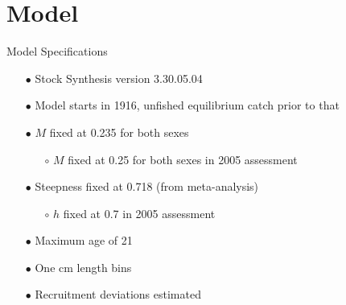\documentclass[ignorenonframetext,]{beamer}
\def\begincol{\begin{column}}
\def\endcol{\end{column}}
\def\endcols{\end{columns}}
\begin{document}

\section{Model}\label{model}

\begin{frame}{Model Specifications}

\begin{itemize}
\item[$\bullet$] Stock Synthesis version 3.30.05.04
\item[$\bullet$] Model starts in 1916, unfished equilibrium catch prior to that
\item[$\bullet$] $M$ fixed at 0.235 for both sexes
\begin{itemize}
\item[$\circ$] $M$ fixed at 0.25 for both sexes in 2005 assessment
\end{itemize}
\item[$\bullet$] Steepness fixed at 0.718 (from meta-analysis)
\begin{itemize}
\item[$\circ$] $h$ fixed at 0.7 in 2005 assessment
\end{itemize}
\item[$\bullet$] Maximum age of 21
\item[$\bullet$] One cm length bins
\item[$\bullet$] Recruitment deviations estimated
\end{itemize}

\end{frame}
\end{document}
